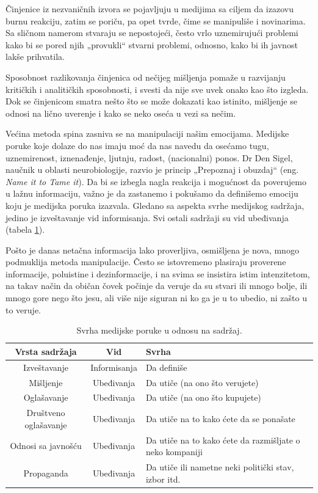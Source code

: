 \documentclass[a4paper]{article}
\begin{document}
Činjenice iz nezvaničnih izvora se pojavljuju u medijima sa ciljem da izazovu burnu reakciju, zatim se poriču, pa opet tvrde, čime se manipuliše i novinarima. Sa sličnom namerom stvaraju se nepostojeći, često vrlo uznemirujući problemi kako bi se pored njih „provukli“ stvarni problemi, odnosno, kako bi ih javnost lakše prihvatila. 

Sposobnost razlikovanja činjenica od nečijeg mišljenja pomaže u razvijanju kritičkih i analitičkih sposobnosti, i svesti da nije sve uvek onako kao što izgleda. Dok se činjenicom smatra nešto što se može dokazati kao istinito, mišljenje se odnosi na lično uverenje i kako se neko oseća u vezi sa nečim. 

Većina metoda spina zasniva se na manipulaciji našim emocijama. Medijske poruke koje dolaze do nas imaju moć da nas navedu da osećamo tugu, uznemirenost, iznenađenje, ljutnju, radost, (nacionalni) ponos. Dr Den Sigel, naučnik u oblasti neurobiologije, razvio je princip „Prepoznaj i obuzdaj“ \cite {nameittotameit} (eng. \emph{Name it to Tame it}). Da bi se izbegla nagla reakcija i mogućnost da poverujemo u lažnu informaciju, važno je da zastanemo i pokušamo da definišemo emociju koju je medijska poruka izazvala. Gledano sa aspekta svrhe medijskog sadržaja, jedino je izveštavanje vid informisanja. Svi ostali sadržaji su vid ubeđivanja (tabela \ref{tab:tabela1}). 

Pošto je danas netačna informacija lako proverljiva, osmišljena je nova, mnogo podmuklija metoda manipulacije. Često se istovremeno plasiraju proverene informacije, poluistine i  dezinformacije, i na svima se insistira istim intenzitetom, na takav način da običan čovek počinje da veruje da su stvari ili mnogo bolje, ili mnogo gore nego što jesu, ali više nije siguran ni ko ga je u to ubedio, ni zašto u to veruje.

\begin{table}[ht!]
\begin{center}
\begin{tabular}{|c|c|p{3cm} |} \hline
Vrsta sadržaja& Vid& Svrha\\ \hline
Izveštavanje&Informisanja&Da definiše\\ \hline
Mišljenje &Ubeđivanja&Da utiče (na ono što verujete)\\ \hline
Oglašavanje &Ubeđivanja&Da utiče (na ono što kupujete)\\ \hline
Društveno oglašavanje &Ubeđivanja&Da utiče na to kako ćete da se ponašate\\ \hline
Odnosi sa javnošću &Ubeđivanja&Da utiče na to kako ćete da razmišljate o neko kompaniji\\ \hline
Propaganda &Ubeđivanja&Da utiče ili nametne neki politički stav, izbor itd.\\ \hline
\end{tabular}
\caption{ Svrha medijske poruke u odnosu na sadržaj.}
\label{tab:tabela1}
\end{center}
\end{table}
\end{document}
